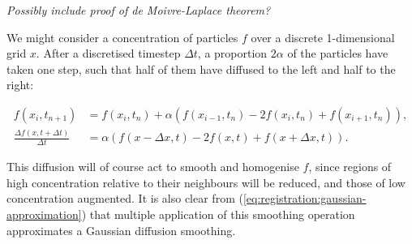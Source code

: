 	  \emph{Possibly include proof of de Moivre-Laplace theorem?}
  
	  We might consider a concentration of particles $f$ over a discrete 1-dimensional grid $x$. After a discretised timestep $\Delta t$, a proportion $2\alpha$ of the particles have taken one step, such that half of them have diffused to the left and half to the right:
  	
	  \begin{align}
	    f(x_i, t_{n+1}) &= f(x_i, t_n) + \alpha (f(x_{i-1}, t_n) - 2f(x_i, t_n) + f(x_{i+1}, t_n)), \label{eqn:diffusion_1d} \\
	    \frac{\Delta f(x, t + \Delta t)}{\Delta t} &= \alpha (f(x - \Delta x, t) - 2f(x, t) + f(x + \Delta x, t)).
		\end{align}
  	
	  This diffusion will of course act to smooth and homogenise $f$, since regions of high concentration relative to their neighbours will be reduced, and those of low concentration augmented. It is also clear from (\ref{eq:registration:gaussian-approximation}) that multiple application of this smoothing operation approximates a Gaussian diffusion smoothing.
		
	
